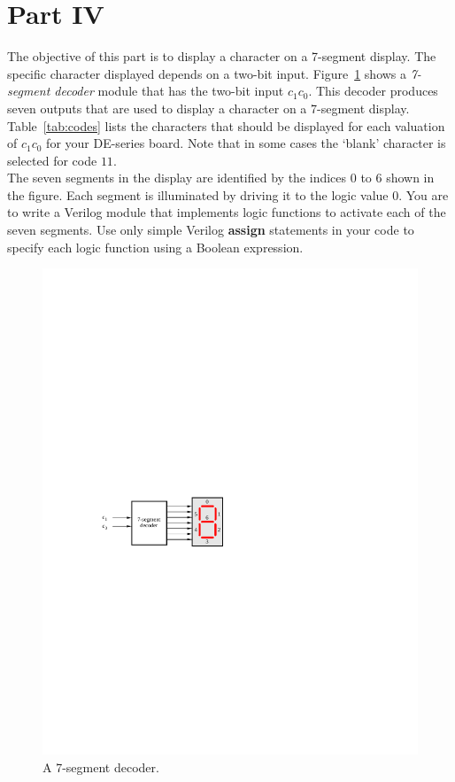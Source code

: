 \documentclass[epsfig,10pt,fullpage]{article}
\begin{document}
\section*{Part IV}
The objective of this part is to display a character on a 7-segment display.
The specific character displayed depends on a two-bit input.
Figure~\ref{fig:6} shows a {\it 7-segment decoder} module that has the two-bit input $c_1
c_0$. This decoder produces seven outputs that are used to display a character on a
7-segment display. Table~\ref{tab:codes} lists the characters that should be displayed for each
valuation of $c_1 c_0$ for your DE-series board. Note that in some cases the `blank' 
character is selected for code $11$.
~\\

The seven segments in the display are identified by the indices 0 to 6 shown in the
figure. Each segment is illuminated by driving it to the logic value 0. You are to write a
Verilog module that implements logic functions to activate
each of the seven segments.
Use only simple Verilog {\bf assign} statements in your code to specify each logic function using a
Boolean expression. 

\begin{figure}[H]
	\begin{center}
		\includegraphics[]{figures/figure6.pdf}
	\end{center}
\caption{A 7-segment decoder.}
\label{fig:6}
\end{figure}
\end{document}
